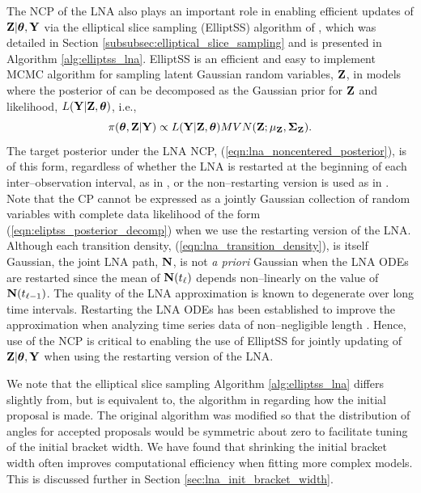 The NCP of the LNA also plays an important role in enabling efficient updates of $ \mathbf{Z}|\boldsymbol{\theta},\mathbf{Y} $ via the elliptical slice sampling (ElliptSS) algorithm of \cite{murray2010}, which was detailed in Section \ref{subsubsec:elliptical_slice_sampling} and is presented in Algorithm \ref{alg:elliptss_lna}. ElliptSS is an efficient and easy to implement MCMC algorithm for sampling latent Gaussian random variables, $ \mathbf{Z} $, in models where the posterior of can be decomposed as the Gaussian prior for $ \mathbf{Z} $ and likelihood, $ L(\mathbf{Y}|\mathbf{Z},\boldsymbol{\theta}) $, i.e.,
\begin{equation}
\label{eqn:eliptss_posterior_decomp}
\pi(\boldsymbol{\theta},\mathbf{Z}|\mathbf{Y})\propto L(\mathbf{Y}|\mathbf{Z},\boldsymbol{\theta})MVN(\mathbf{Z};\mu_{\mathbf{Z}},\boldsymbol{\Sigma}_{\mathbf{Z}}).
\end{equation}
The target posterior under the LNA NCP, (\ref{eqn:lna_noncentered_posterior}), is of this form, regardless of whether the LNA is restarted at the beginning of each inter--observation interval, as in \cite{fearnhead2014}, or the non--restarting version is used as in \cite{komorowski2009}. Note that the CP cannot be expressed as a jointly Gaussian collection of random variables with complete data likelihood of the form (\ref{eqn:eliptss_posterior_decomp}) when we use the restarting version of the LNA. Although each transition density, (\ref{eqn:lna_transition_density}), is itself Gaussian, the joint LNA path, $ \mathbf{N} $, is not \textit{a priori} Gaussian when the LNA ODEs are restarted since the mean of $ \mathbf{N}(t_\ell) $ depends non--linearly on the value of $ \mathbf{N}(t_{\ell-1}) $. The quality of the LNA approximation is known to degenerate over long time intervals. Restarting the LNA ODEs has been established to improve the approximation when analyzing time series data of non--negligible length \cite{fearnhead2014,giagos2010inference,folia2017trajectory,minas2017long}. Hence, use of the NCP is critical to enabling the use of ElliptSS for jointly updating of $ \mathbf{Z}|\boldsymbol{\theta},\mathbf{Y} $ when using the restarting version of the LNA. 

We note that the elliptical slice sampling Algorithm \ref{alg:elliptss_lna} differs slightly from, but is equivalent to, the algorithm in \cite{murray2010} regarding how the initial proposal is made. The original algorithm was modified so that the distribution of angles for accepted proposals would be symmetric about zero to facilitate tuning of the initial bracket width. We have found that shrinking the initial bracket width often improves computational efficiency when fitting more complex models. This is discussed further in Section \ref{sec:lna_init_bracket_width}.

